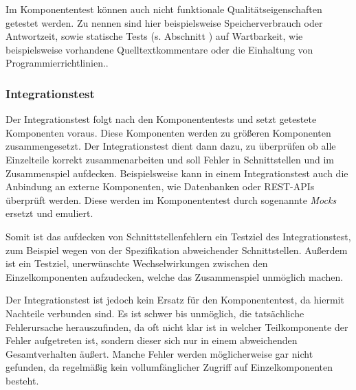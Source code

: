 Im Komponententest können auch nicht funktionale Qualitätseigenschaften getestet werden. Zu nennen sind hier beispielsweise Speicherverbrauch oder Antwortzeit, sowie statische Tests (s. Abschnitt ) auf Wartbarkeit, wie beispielsweise vorhandene Quelltextkommentare oder die Einhaltung von Programmierrichtlinien.\cite[][49\psq]{spillner}.

\subsubsection{Integrationstest}
Der Integrationstest folgt nach den Komponententests und setzt getestete Komponenten voraus. Diese Komponenten werden zu größeren Komponenten zusammengesetzt. Der Integrationstest dient dann dazu, zu überprüfen ob alle Einzelteile korrekt zusammenarbeiten und soll Fehler in Schnittstellen und im Zusammenspiel aufdecken. \cite[][52\psq]{spillner} Beispielsweise kann in einem Integrationstest auch die Anbindung an externe Komponenten, wie Datenbanken oder REST-APIs überprüft werden. Diese werden im Komponententest durch sogenannte \textit{Mocks} ersetzt und emuliert.

Somit ist das aufdecken von Schnittstellenfehlern ein Testziel des Integrationstest, zum Beispiel wegen von der Spezifikation abweichender Schnittstellen. Außerdem ist ein Testziel, unerwünschte Wechselwirkungen zwischen den Einzelkomponenten aufzudecken, welche das Zusammenspiel unmöglich machen. \cite[][56]{spillner}

Der Integrationstest ist jedoch kein Ersatz für den Komponententest, da hiermit Nachteile verbunden sind. Es ist schwer bis unmöglich, die tatsächliche Fehlerursache herauszufinden, da oft nicht klar ist in welcher Teilkomponente der Fehler aufgetreten ist, sondern dieser sich nur in einem abweichenden Gesamtverhalten äußert. Manche Fehler werden möglicherweise gar nicht gefunden, da regelmäßig kein vollumfänglicher Zugriff auf Einzelkomponenten besteht.\cite[][57]{spillner}

